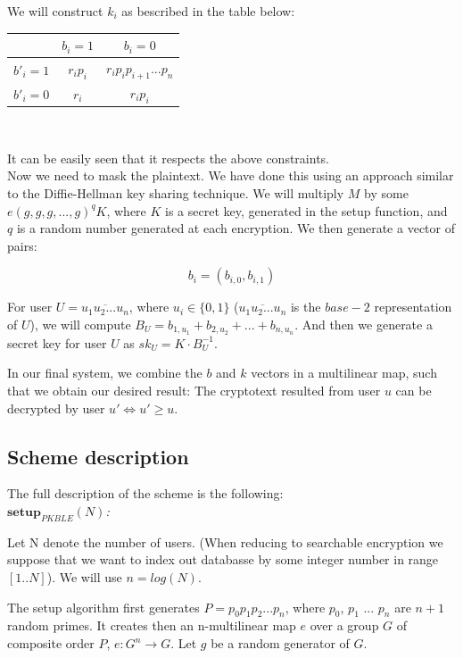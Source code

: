\documentclass[a4paper, 12pt, oneside]{article}
\begin{document}
We will construct $k_i$ as bescribed in the table below:

\begin{center}
 \begin{tabular}{|c || c c|} 
 \hline
  & $b_i = 1$ & $b_i = 0$\\ [0.5ex] 
 \hline\hline
 $b'_i = 1$ & $r_ip_i$ & $r_ip_ip_{i+1}...p_n$ \\ 
 \hline
 $b'_i = 0$ & $r_i$ & $r_ip_i$\\ [1ex] 
 \hline
\end{tabular}
\\
\end{center}

It can be easily seen that it respects the above constraints.\\

Now we need to mask the plaintext. We have done this using an approach similar to the Diffie-Hellman key sharing technique. We will multiply $M$ by some $e(g, g, g,..., g)^qK$, where $K$ is a secret key, generated in the setup function, and $q$ is a random number generated at each encryption. We then generate a vector of pairs:  

\[ b_i = (b_{i,0}, b_{i,1}) \]

	For user $U=\overline{u_1u_2...u_n}$, where $u_i \in \{0, 1\}$ ($\overline{u_1u_2...u_n}$ is the $base-2$ representation of $U$), we will compute 
	$B_U = b_{1, u_1} + b_{2, u_2} + ... + b_{n, u_n}$. And then we generate a secret key for user $U$ as $sk_U = K\cdot B_U^{-1}$.
	
	\bigskip
	In our final system, we combine the $b$ and $k$ vectors in a multilinear map, such that we obtain our desired result: The cryptotext resulted from user $u$ can be decrypted by user $u' \Leftrightarrow u' \geq u$.

\subsection{Scheme description}
The full description of the scheme is the following:
\\



\textit{$\mathbf{setup}_{PKBLE}(N)$:}


Let N denote the number of users. (When reducing to searchable encryption we suppose that we want to index out databasse by some integer number in range $[1..N]$). We will use $n = log(N)$.


The setup algorithm first generates $P = p_0 p_1  p_2 ... p_n $, where $p_0$, $p_1$ ... $p_n$ are $n+1$ random primes.
It creates then an n-multilinear map $e$ over a group $G$ of composite order $P$, 
$e : G^n \rightarrow G$. Let $g$ be a random generator of $G$.\\
 
\end{document}
